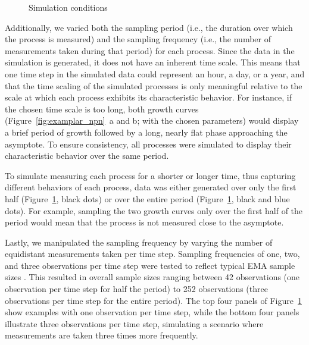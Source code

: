 \documentclass[man, floatsintext]{apa7}
\begin{document}
\begin{figure}[!t]
  \caption{Simulation conditions}
  \label{fig:exemplar_pn}
\end{figure}

Additionally, we varied both the sampling period (i.e., the duration over which
the process is measured) and the sampling frequency (i.e., the number of
measurements taken during that period) for each process. Since the data in the
simulation is generated, it does not have an inherent time scale. This means
that one time step in the simulated data could represent an hour, a day, or a
year, and that the time scaling of the simulated processes is only meaningful
relative to the scale at which each process exhibits its characteristic
behavior. For instance, if the chosen time scale is too long, both growth
curves (Figure~\ref{fig:examplar_npn}~a and b; with the chosen parameters)
would display a brief period of growth followed by a long, nearly flat phase
approaching the asymptote. To ensure consistency, all processes were simulated
to display their characteristic behavior over the same period.

To simulate measuring each process for a shorter or longer time, thus capturing
different behaviors of each process, data was either generated over only the
first half (Figure~\ref{fig:exemplar_pn}, black dots) or over the entire period
(Figure~\ref{fig:exemplar_pn}, black and blue dots). For example, sampling the
two growth curves only over the first half of the period would mean that the
process is not measured close to the asymptote.

Lastly, we manipulated the sampling frequency by varying the number of
equidistant measurements taken per time step. Sampling frequencies of one, two,
and three observations per time step were tested to reflect typical EMA sample
sizes \parencite{wrzus_ecological_2023}. This resulted in overall sample sizes
ranging between 42 observations (one observation per time step for half the
period) to 252 observations (three observations per time step for the entire
period). The top four panels of Figure~\ref{fig:exemplar_pn} show examples with
one observation per time step, while the bottom four panels illustrate three
observations per time step, simulating a scenario where measurements are taken
three times more frequently.
\end{document}
